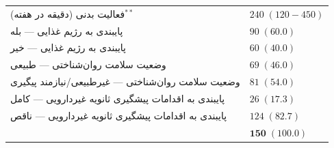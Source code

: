 {\begin{xltabular}{\textwidth}{@{} >{\raggedright\arraybackslash}X >{\centering\arraybackslash}X @{}}
        فعالیت بدنی (دقیقه در هفته)$^{**}$ & $240 \; (120 - 450)$ \\


        پایبندی به رژیم غذایی --- بله & $90 \; (60.0)$ \\

        پایبندی به رژیم غذایی --- خیر & $60 \; (40.0)$ \\


        وضعیت سلامت روان‌شناختی --- طبیعی             & $69 \; (46.0)$ \\

        وضعیت سلامت روان‌شناختی --- غیرطبیعی/نیازمند پیگیری & $81 \; (54.0)$ \\


        پایبندی به اقدامات پیشگیری ثانویه غیر‌دارویی --- کامل  & $26 \; (17.3)$ \\

        پایبندی به اقدامات پیشگیری ثانویه غیر‌دارویی --- ناقص & $124 \; (82.7)$ \\

        \midrule




         & $\mathbf{150 \; (100.0)}$ \\



    \end{xltabular}

}
